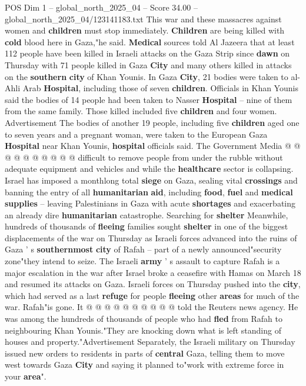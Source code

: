 \begin{textsample}{POS Dim 1 – global\_north\_2025\_04 – Score 34.00 – global\_north\_2025\_04/123141183.txt}
This war and these massacres against women and \textbf{children} must stop immediately. \textbf{Children} are being killed with \textbf{cold} blood here in Gaza,"he said. \textbf{Medical} sources told Al Jazeera that at least 112 people have been killed in Israeli attacks on the Gaza Strip since \textbf{dawn} on Thursday with 71 people killed in Gaza \textbf{City} and many others killed in attacks on the \textbf{southern} \textbf{city} of Khan Younis.
In Gaza \textbf{City}, 21 bodies were taken to al-Ahli Arab \textbf{Hospital}, including those of seven \textbf{children}.
Officials in Khan Younis said the bodies of 14 people had been taken to Nasser \textbf{Hospital} -- nine of them from the same family.
Those killed included five \textbf{children} and four women.
Advertisement The bodies of another 19 people, including five \textbf{children} aged one to seven years and a pregnant woman, were taken to the European Gaza \textbf{Hospital} near Khan Younis, \textbf{hospital} officials said.
The Government Media @ @ @ @ @ @ @ @ @ @ difficult to remove people from under the rubble without adequate equipment and vehicles and while the \textbf{healthcare} sector is collapsing.
Israel has imposed a monthlong total \textbf{siege} on Gaza, sealing vital \textbf{crossings} and banning the entry of all \textbf{humanitarian} \textbf{aid}, including \textbf{food}, \textbf{fuel} and \textbf{medical} \textbf{supplies} -- leaving Palestinians in Gaza with acute \textbf{shortages} and exacerbating an already dire \textbf{humanitarian} catastrophe.
Searching for \textbf{shelter} Meanwhile, hundreds of thousands of \textbf{fleeing} families sought \textbf{shelter} in one of the biggest displacements of the war on Thursday as Israeli forces advanced into the ruins of Gaza ' s \textbf{southernmost} \textbf{city} of Rafah -- part of a newly announced"security zone"they intend to seize.
The Israeli \textbf{army} ' s assault to capture Rafah is a major escalation in the war after Israel broke a ceasefire with Hamas on March 18 and resumed its attacks on Gaza.
Israeli forces on Thursday pushed into the \textbf{city}, which had served as a last \textbf{refuge} for people \textbf{fleeing} other \textbf{areas} for much of the war.
Rafah"is gone.
It @ @ @ @ @ @ @ @ @ @ told the Reuters news agency.
He was among the hundreds of thousands of people who had \textbf{fled} from Rafah to neighbouring Khan Younis."They are knocking down what is left standing of houses and property."Advertisement Separately, the Israeli military on Thursday issued new orders to residents in parts of \textbf{central} Gaza, telling them to move west towards Gaza \textbf{City} and saying it planned to"work with extreme force in your \textbf{area}".

\end{textsample}
